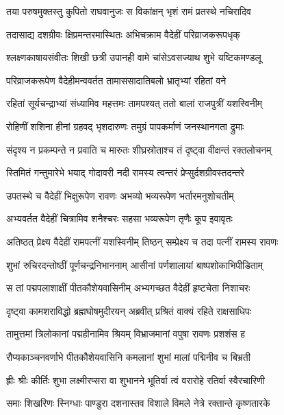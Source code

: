 
\twolineshloka
{तया परुषमुक्तस्तु कुपितो राघवानुजः}
{स विकांक्षन् भृशं रामं प्रतस्थे नचिरादिव} %

\twolineshloka
{तदासाद्य दशग्रीवः क्षिप्रमन्तरमास्थितः}
{अभिचक्राम वैदेहीं परिव्राजकरूपधृक्} %

\twolineshloka
{श्लक्ष्णकाषायसंवीतः शिखी छत्री उपानही}
{वामे चांसेऽवसज्याथ शुभे यष्टिकमण्डलू} %

\twolineshloka
{परिव्राजकरूपेण वैदेहीमन्ववर्तत}
{तामाससादातिबलो भ्रातृभ्यां रहितां वने} %

\twolineshloka
{रहितां सूर्यचन्द्राभ्यां संध्यामिव महत्तमः}
{तामपश्यत् ततो बालां राजपुत्रीं यशस्विनीम्} %

\twolineshloka
{रोहिणीं शशिना हीनां ग्रहवद् भृशदारुणः}
{तमुग्रं पापकर्माणं जनस्थानगता द्रुमाः} %

\twolineshloka
{संदृश्य न प्रकम्पन्ते न प्रवाति च मारुतः}
{शीघ्रस्रोताश्च तं दृष्ट्वा वीक्षन्तं रक्तलोचनम्} %

\twolineshloka
{स्तिमितं गन्तुमारेभे भयाद् गोदावरी नदी}
{रामस्य त्वन्तरं प्रेप्सुर्दशग्रीवस्तदन्तरे} %

\twolineshloka
{उपतस्थे च वैदेहीं भिक्षुरूपेण रावणः}
{अभव्यो भव्यरूपेण भर्तारमनुशोचतीम्} %

\twolineshloka
{अभ्यवर्तत वैदेहीं चित्रामिव शनैश्चरः}
{सहसा भव्यरूपेण तृणैः कूप इवावृतः} %

\twolineshloka
{अतिष्ठत् प्रेक्ष्य वैदेहीं रामपत्नीं यशस्विनीम्}
{तिष्ठन् सम्प्रेक्ष्य च तदा पत्नीं रामस्य रावणः} %

\twolineshloka
{शुभां रुचिरदन्तोष्ठीं पूर्णचन्द्रनिभाननाम्}
{आसीनां पर्णशालायां बाष्पशोकाभिपीडिताम्} %

\twolineshloka
{स तां पद्मपलाशाक्षीं पीतकौशेयवासिनीम्}
{अभ्यगच्छत वैदेहीं हृष्टचेता निशाचरः} %

\twolineshloka
{दृष्ट्वा कामशराविद्धो ब्रह्मघोषमुदीरयन्}
{अब्रवीत् प्रश्रितं वाक्यं रहिते राक्षसाधिपः} %

\twolineshloka
{तामुत्तमां त्रिलोकानां पद्महीनामिव श्रियम्}
{विभ्राजमानां वपुषा रावणः प्रशशंस ह} %

\twolineshloka
{रौप्यकाञ्चनवर्णाभे पीतकौशेयवासिनि}
{कमलानां शुभां मालां पद्मिनीव च बिभ्रती} %

\twolineshloka
{ह्रीः श्रीः कीर्तिः शुभा लक्ष्मीरप्सरा वा शुभानने}
{भूतिर्वा त्वं वरारोहे रतिर्वा स्वैरचारिणी} %

\twolineshloka
{समाः शिखरिणः स्निग्धाः पाण्डुरा दशनास्तव}
{विशाले विमले नेत्रे रक्तान्ते कृष्णतारके} %

